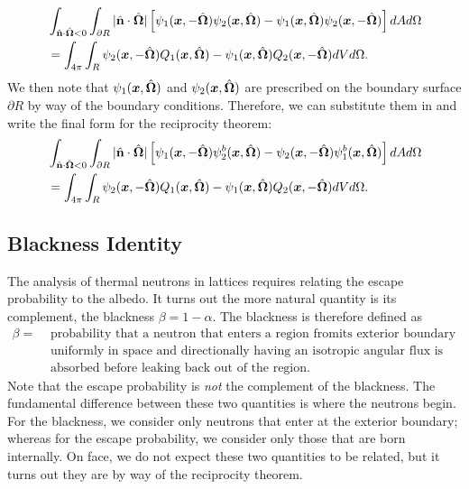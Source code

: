 \begin{align}
  &\int_{\hat{\mathbf{n}} \cdot \hat{\mathbf{\Omega}} < 0} \int_{\partial R} |\hat{\mathbf{n}} \cdot \hat{\mathbf{\Omega}}| \left[ \psi_1(\bm{x},-\hat{\mathbf{\Omega}}) \psi_2(\bm{x},\hat{\mathbf{\Omega}}) - \psi_1(\bm{x},\hat{\mathbf{\Omega}}) \psi_2(\bm{x},-\hat{\mathbf{\Omega}}) \right] dA d\Omega  \nonumber \\*
  &= \int_{4\pi} \int_R  \psi_2(\bm{x},-\hat{\mathbf{\Omega}}) Q_1(\bm{x},\hat{\mathbf{\Omega}}) - \psi_1(\bm{x},\hat{\mathbf{\Omega}}) Q_2(\bm{x},-\hat{\mathbf{\Omega}}) dV d\Omega.
\end{align}
We then note that $\psi_1(\bm{x},\hat{\mathbf{\Omega}})$ and $\psi_2(\bm{x},\hat{\mathbf{\Omega}})$ are prescribed on the boundary surface $\partial R$ by way of the boundary conditions. Therefore, we can substitute them in and write the final form for the reciprocity theorem:
\begin{align}
  &\int_{\hat{\mathbf{n}} \cdot \hat{\mathbf{\Omega}} < 0} \int_{\partial R} |\hat{\mathbf{n}} \cdot \hat{\mathbf{\Omega}}| \left[ \psi_1(\bm{x},-\hat{\mathbf{\Omega}}) \psi_2^b(\bm{x},\hat{\mathbf{\Omega}}) -  \psi_2(\bm{x},-\hat{\mathbf{\Omega}}) \psi_1^b(\bm{x},\hat{\mathbf{\Omega}}) \right] dA d\Omega  \nonumber \\*
  &= \int_{4\pi} \int_R  \psi_2(\bm{x},-\hat{\mathbf{\Omega}}) Q_1(\bm{x},\hat{\mathbf{\Omega}}) - \psi_1(\bm{x},\hat{\mathbf{\Omega}}) Q_2(\bm{x},-\hat{\mathbf{\Omega}}) dV d\Omega. \label{Eq:thermalization_generalizedReciprocityTheorem}
\end{align}

\subsection{Blackness Identity}

The analysis of thermal neutrons in lattices requires relating the escape probability to the albedo. It turns out the more natural quantity is its complement, the blackness $\beta = 1 - \alpha$. The blackness is therefore defined as
\begin{align}
  \beta = &\text{ probability that a neutron that enters a region fromits exterior boundary } \nonumber \\
          &\text{ uniformly in space and directionally having an isotropic angular flux is } \nonumber \\
          &\text{ absorbed before leaking back out of the region.} \nonumber
\end{align}
Note that the escape probability is \emph{not} the complement of the blackness. The fundamental difference between these two quantities is where the neutrons begin. For the blackness, we consider only neutrons that enter at the exterior boundary; whereas for the escape probability, we consider only those that are born internally. On face, we do not expect these two quantities to be related, but it turns out they are by way of the reciprocity theorem.


